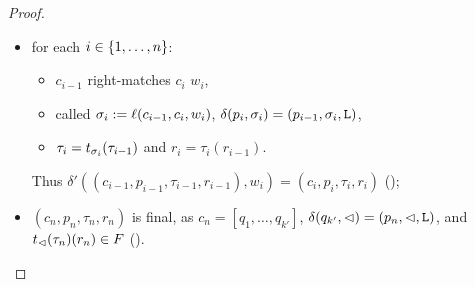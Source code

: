 \begin{proof}
\begin{itemize}
		\item for each $i\in\{1,\dots,n\}$:
		      \begin{itemize}
			      \item $c_{i-1}$ right-matches $c_i$ \wrt $w_i$,
			      \item called $\sigma_i:=\ell(c_{i-1},c_i,w_i)$, $\delta(p_i,\sigma_i)=(p_{i-1},\sigma_i,\mathtt L)$,
			      \item $\tau_i=t_{\sigma_i}(\tau_{i-1})$ and $r_i=\tau_i(r_{i-1})$.
		      \end{itemize}
		      Thus $\delta'((c_{i-1},p_{i-1},\tau_{i-1},r_{i-1}),w_i)=(c_i,p_i,\tau_i,r_i)$ ();
		\item $(c_n,p_n,\tau_n,r_n)$ is final, as $c_n=[q_1,\dots,q_{k'}]$, $\delta(q_{k'},\lhd)=(p_n,\lhd,\mathtt L)$, and $t_\lhd(\tau_n)(r_n)\in F$ (). \qedhere
	\end{itemize}
\end{proof}


